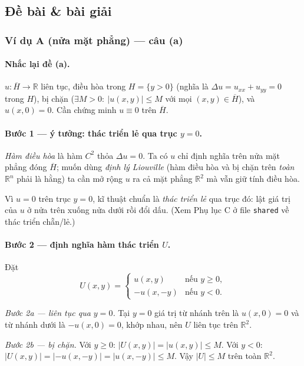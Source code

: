 \subsection*{Đề bài \& bài giải}

\subsubsection*{Ví dụ A (nửa mặt phẳng) --- câu (a)}

\paragraph{Nhắc lại đề (a).} $u:\overline{H}\to\mathbb{R}$ liên tục, điều hòa trong $H=\{y>0\}$ (nghĩa là $\Delta u=u_{xx}+u_{yy}=0$ trong $H$), bị chặn ($\exists M>0:\ |u(x,y)|\le M$ với mọi $(x,y)\in\overline H$), và $u(x,0)=0$. Cần chứng minh $u\equiv 0$ trên $\overline H$.

\paragraph{Bước 1 --- ý tưởng: thác triển lẻ qua trục $y=0$.}
\emph{Hàm điều hòa} là hàm $C^2$ thỏa $\Delta u=0$. Ta có $u$ chỉ định nghĩa trên nửa mặt phẳng đóng $\overline{H}$; muốn dùng \emph{định lý Liouville} (hàm điều hòa và bị chặn trên \emph{toàn} $\mathbb{R}^n$ phải là hằng) ta cần mở rộng $u$ ra cả mặt phẳng $\mathbb{R}^2$ mà vẫn giữ tính điều hòa.

Vì $u=0$ trên trục $y=0$, kĩ thuật chuẩn là \emph{thác triển lẻ} qua trục đó: lật giá trị của $u$ ở nửa trên xuống nửa dưới rồi đổi dấu. (Xem Phụ lục C ở file \texttt{shared} về thác triển chẵn/lẻ.)

\paragraph{Bước 2 --- định nghĩa hàm thác triển $U$.}
Đặt
\[
U(x,y)=
\begin{cases}
u(x,y) & \text{nếu } y\ge 0,\\
-u(x,-y) & \text{nếu } y<0.
\end{cases}
\]

\emph{Bước 2a --- liên tục qua $y=0$.} Tại $y=0$ giá trị từ nhánh trên là $u(x,0)=0$ và từ nhánh dưới là $-u(x,0)=0$, khớp nhau, nên $U$ liên tục trên $\mathbb{R}^2$.

\emph{Bước 2b --- bị chặn.} Với $y\ge 0$: $|U(x,y)|=|u(x,y)|\le M$. Với $y<0$: $|U(x,y)|=|{-u(x,-y)}|=|u(x,-y)|\le M$. Vậy $|U|\le M$ trên toàn $\mathbb{R}^2$.

